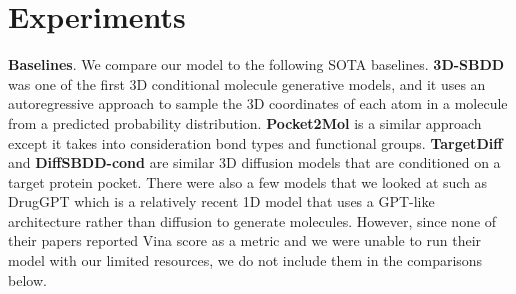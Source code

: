 \documentclass[11pt]{article}
\begin{document}
\section{Experiments}

\textbf{Baselines}. We compare our model to the following SOTA 
baselines. \textbf{3D-SBDD} \cite{luo20223dgenerativemodelstructurebased}
was one of the first 3D conditional molecule generative models, 
and it uses an autoregressive approach to sample the 3D coordinates of 
each atom in a molecule
from a predicted probability distribution. \textbf{Pocket2Mol} \cite{peng2022pocket2molefficientmolecularsampling}
is a similar approach except it takes into consideration bond types 
and functional groups. \textbf{TargetDiff} \cite{guan2023d} and 
\textbf{DiffSBDD-cond} \cite{schneuing2023} are similar 
3D diffusion models that are conditioned on a target protein pocket. There were 
also a few models that we looked at such as DrugGPT which is a relatively 
recent 1D model that uses a GPT-like architecture rather than diffusion
to generate molecules.
However, since none of their papers reported Vina score as a metric and we 
were unable to run their model with our limited resources, we do not include them 
in the comparisons below.
\end{document}
